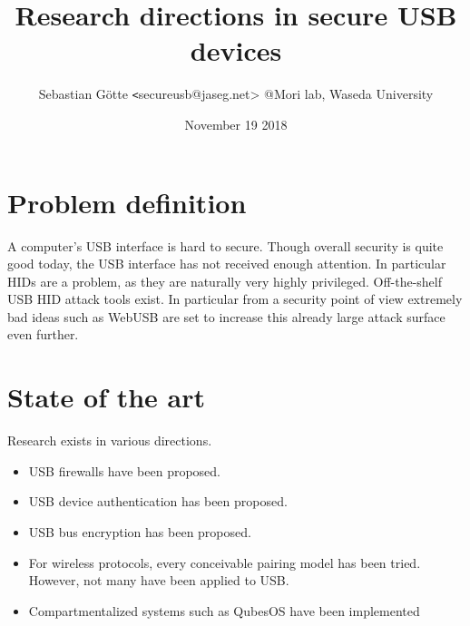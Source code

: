 \documentclass[12pt,a4paper,notitlepage]{article}
\author{Sebastian Götte {\texttt<secureusb@jaseg.net>} @Mori lab, Waseda University}
\title{Research directions in secure USB devices}
\date{November 19 2018}
\begin{document}
\maketitle

\section{Problem definition}
A computer's USB interface is hard to secure. Though overall security is quite good today, the USB interface has not
received enough attention. In particular HIDs are a problem, as they are naturally very highly privileged.
Off-the-shelf USB HID attack tools exist. In particular from a security point of view extremely bad ideas such as
WebUSB\cite{misc01} are set to increase this already large attack surface even further.

\section{State of the art}
Research exists in various directions.
\begin{itemize}
    \item USB firewalls have been proposed\cite{tian01,angel01,kang01,bates01,loe01}.
    \item USB device authentication has been proposed\cite{usb01,griscioli01,wang01,he01}.
    \item USB bus encryption has been proposed\cite{neugschwandtner01,weinstein01}.
    \item For wireless protocols, every conceivable pairing model has been tried. However, not many have been applied to
        USB\cite{arun01,uzun01,kobsa01,saxena01}.
    \item Compartmentalized systems such as QubesOS have been implemented
\end{itemize}
\end{document}
